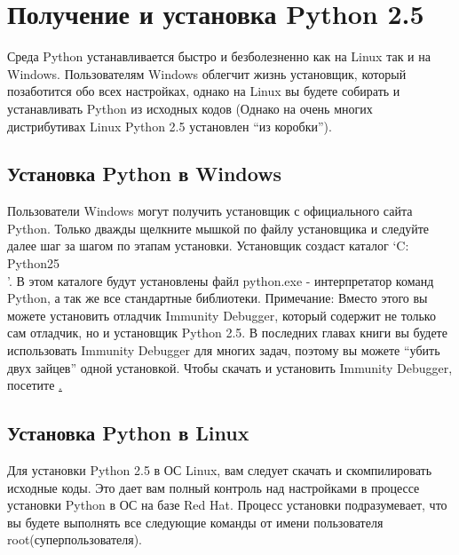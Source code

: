 \documentclass[12pt]{book}
\begin{document}
\section{Получение и установка Python 2.5}

Среда Python устанавливается быстро и безболезненно как на Linux так и на Windows. Пользователям Windows облегчит жизнь установщик, который позаботится обо всех настройках, однако на Linux вы будете собирать и устанавливать Python из исходных кодов (Однако на очень многих дистрибутивах Linux Python 2.5 установлен ``из коробки'').

\subsection{Установка Python в Windows}

Пользователи Windows могут получить установщик с официального сайта Python. Только дважды щелкните мышкой по файлу установщика и следуйте далее шаг за шагом по этапам установки. Установщик создаст каталог `C:\\Python25\\'. В этом каталоге будут установлены файл python.exe - интерпретатор команд Python, а так же все стандартные библиотеки.
Примечание: Вместо этого вы можете установить отладчик Immunity Debugger, который содержит не только сам отладчик, но и установщик Python 2.5. В последних главах книги вы будете использовать Immunity Debugger для многих задач, поэтому вы можете ``убить двух зайцев'' одной установкой. Чтобы скачать и установить Immunity Debugger, посетите \href{http://debugger.immunityinc.com}.

\subsection{Установка Python в Linux}

Для установки Python 2.5 в ОС Linux, вам следует скачать и скомпилировать исходные коды. Это дает вам полный контроль над настройками в процессе установки Python в ОС на базе Red Hat. Процесс установки подразумевает, что вы будете выполнять все следующие команды от имени пользователя root(суперпользователя).
\end{document}
